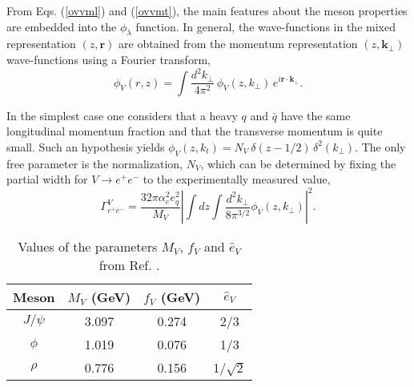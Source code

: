 \documentclass[twocolumn,showpacs,preprintnumbers,amsmath,amssymb,showkeys,aps,prd,a4paper,byrevtex]{revtex4}
\begin{document}
From Eqs. (\ref{ovvml}) and (\ref{ovvmt}), the main features about the meson properties are embedded into the $\phi_{\lambda}$ function. In general, the wave-functions in the mixed representation $(z,\mathbf{r})$ are obtained from the momentum representation $(z,\mathbf{k}_{\perp})$ wave-functions using a Fourier transform,
\begin{equation}
\label{fouriertrans}
\phi_V(r,z) = \int \frac{d^{2}k_{\perp}}{ 4\pi^2 }\, \phi_{V}(z,k_{\perp})\,
e^{i\mathbf{r}\cdot \mathbf{k}_{\perp}}.
\end{equation}

In the simplest case one considers that a heavy $q$ and $\bar{q}$ have the same longitudinal momentum fraction and that the transverse momentum is quite small. Such an hypothesis yields $\phi_{V}(z,k_t)=N_V\ \delta(z-1/2)\,\delta^2(k_{\perp})$. The only free parameter is the normalization, $N_V$, which can be determined by fixing the partial width for $V \rightarrow e^+e^-$ to the
experimentally measured value,
\begin{equation}
\Gamma^{V}_{e^+e^-}=\frac{32 \pi\alpha_e^2 e_q^2}{M_V}\left| \int dz \int \frac{
d^{2}k_{\perp}}{8\pi^{3/2}} \phi_V (z,k_{\perp}) \right|^2.
\end{equation}

\begin{table}[t]
\begin{tabular}{||c|c|c|c||} \hline\hline
Meson & $M_V$ (GeV) & $f_V$ (GeV) & $\hat{e}_V$  \\ \hline
$J/\psi$ & 3.097 & 0.274 & 2/3 \\
$\phi$ & 1.019 & 0.076 & 1/3 \\
$\rho$ & 0.776 & 0.156 & 1/$\sqrt{2}$ \\ \hline\hline
\end{tabular}
\caption{\label{tab:par} Values of the parameters $M_V$, $f_V$ and $\hat{e}_V$ from Ref. \cite{Kowalski:2006hc}.}
\end{table}
\end{document}
